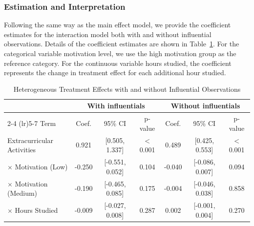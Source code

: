 \documentclass[10pt,letterpaper]{article}
\begin{document}
\subsubsection{Estimation and Interpretation}
Following the same way as the main effect model, we provide the coefficient estimates for the interaction model both with and without influential observations. Details of the coefficient estimates are shown in Table~\ref{tab:interaction-effects}. For the categorical variable motivation level, we use the high motivation group as the reference category. For the continuous variable hours studied, the coefficient represents the change in treatment effect for each additional hour studied.

\begin{table}[htbp]
\centering
\caption{Heterogeneous Treatment Effects with and without Influential Observations}
\label{tab:interaction-effects}
\begin{tabular}{lccc ccc}
\toprule
& \multicolumn{3}{c}{With influentials} & \multicolumn{3}{c}{Without influentials} \\
\cmidrule(lr){2-4} \cmidrule(lr){5-7}
Term & Coef. & 95\% CI & p-value & Coef. & 95\% CI & p-value \\
\midrule
Extracurricular Activities 
& 0.921 & [0.505, 1.337] & $<$0.001 
& 0.489 & [0.425, 0.553] & $<$0.001 \\

$\times$ Motivation (Low) 
& -0.250 & [-0.551, 0.052] & 0.104 
& -0.040 & [-0.086, 0.007] & 0.094 \\

$\times$ Motivation (Medium) 
& -0.190 & [-0.465, 0.085] & 0.175 
& -0.004 & [-0.046, 0.038] & 0.858 \\

$\times$ Hours Studied 
& -0.009 & [-0.027, 0.008] & 0.287 
& 0.002 & [-0.001, 0.004] & 0.270 \\

\bottomrule
\end{tabular}
\end{table}
\end{document}
